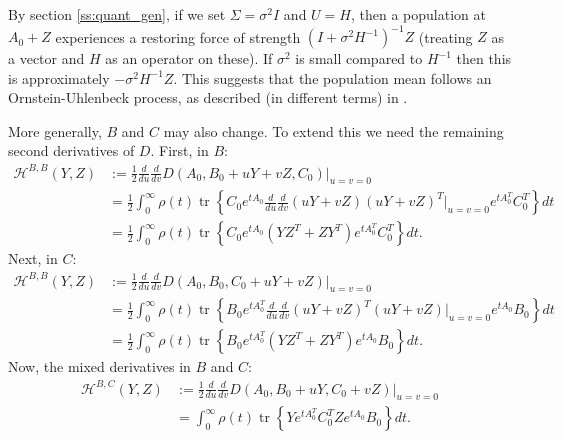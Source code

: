 \documentclass{article}
\newcommand{\tr}{\mathop{\mbox{tr}}} %
\newcommand{\1}{\mathbbm{1}}
\begin{document}
By section \ref{ss:quant_gen},
if we set $\Sigma=\sigma^2 I$ and $U=H$,
then a population at $A_0+Z$ experiences a restoring force of strength
$(I + \sigma^2 H^{-1})^{-1} Z$ (treating $Z$ as a vector and $H$ as an operator on these).
If $\sigma^2$ is small compared to $H^{-1}$
then this is approximately $-\sigma^2 H^{-1} Z$.
This suggests that the population mean follows an Ornstein-Uhlenbeck process,
as described (in different terms) in \citet{hansen1996translating}.

More generally, $B$ and $C$ may also change.
To extend this we need the remaining second derivatives of $D$.
First, in $B$:
\begin{equation}
    \begin{aligned}
        \mathcal{H}^{B,B}(Y,Z)
        &:= 
        \frac{1}{2} \frac{d}{du} \frac{d}{dv} D(A_0,B_0+uY+vZ,C_0)\vert_{u=v=0} \\
        &=
        \frac{1}{2} \int_0^\infty \rho(t) \tr\left\{ 
        C_0 e^{t A_0}
        \frac{d}{du} \frac{d}{dv} 
        (uY+vZ)
        (uY+vZ)^T
        \vert_{u=v=0} 
        e^{t A_0^T} C_0^T 
        \right\} dt  \\
        &=
        \frac{1}{2} \int_0^\infty \rho(t) \tr\left\{ 
        C_0 e^{t A_0}
        \left( Y Z^T + Z Y^T \right)
        e^{t A_0^T} C_0^T 
        \right\} dt  .
  \end{aligned}
\end{equation}
Next, in $C$:
\begin{equation}
    \begin{aligned}
        \mathcal{H}^{B,B}(Y,Z)
        &:= 
        \frac{1}{2} \frac{d}{du} \frac{d}{dv} D(A_0,B_0,C_0+uY+vZ)\vert_{u=v=0} \\
        &=
        \frac{1}{2} \int_0^\infty \rho(t) \tr\left\{ 
        B_0 e^{t A_0^T}
        \frac{d}{du} \frac{d}{dv} 
        (uY+vZ)^T
        (uY+vZ)
        \vert_{u=v=0} 
        e^{t A_0} B_0
        \right\} dt  \\
        &=
        \frac{1}{2} \int_0^\infty \rho(t) \tr\left\{ 
        B_0 e^{t A_0^T}
        \left( Y Z^T + Z Y^T \right)
        e^{t A_0} B_0
        \right\} dt  .
  \end{aligned}
\end{equation}
Now, the mixed derivatives in $B$ and $C$:
\begin{equation}
    \begin{aligned}
        \mathcal{H}^{B,C}(Y,Z)
        &:= 
        \frac{1}{2} \frac{d}{du} \frac{d}{dv} D(A_0,B_0+uY,C_0+vZ)\vert_{u=v=0} \\
        &=
        \int_0^\infty \rho(t) \tr\left\{ 
        Y e^{t A_0^T} C_0^T Z e^{t A_0} B_0
        \right\} dt  .
  \end{aligned}
\end{equation}
\end{document}
